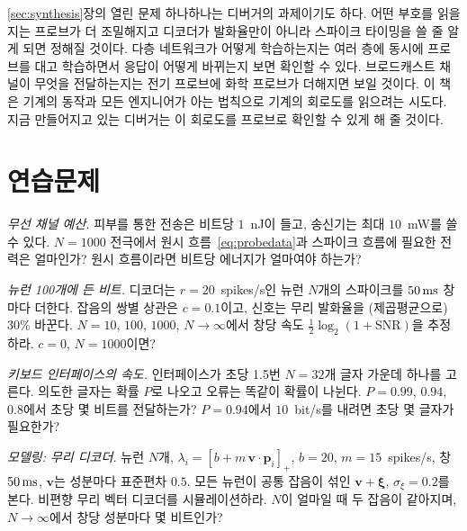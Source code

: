 \ref{sec:synthesis}장의 열린 문제 하나하나는 디버거의 과제이기도 하다. 어떤 부호를 읽을지는 프로브가 더 조밀해지고 디코더가 발화율만이 아니라 스파이크 타이밍을 쓸 줄 알게 되면 정해질 것이다. 다층 네트워크가 어떻게 학습하는지는 여러 층에 동시에 프로브를 대고 학습하면서 응답이 어떻게 바뀌는지 보면 확인할 수 있다. 브로드캐스트 채널이 무엇을 전달하는지는 전기 프로브에 화학 프로브가 더해지면 보일 것이다. 이 책은 기계의 동작과 모든 엔지니어가 아는 법칙으로 기계의 회로도를 읽으려는 시도다. 지금 만들어지고 있는 디버거는 이 회로도를 프로브로 확인할 수 있게 해 줄 것이다.

\section{연습문제}

\begin{exercise}[\lvlA]
\label{ex:17:1}
\emph{무선 채널 예산.} 피부를 통한 전송은 비트당 $1$~nJ이 들고, 송신기는 최대 $10$~mW를 쓸 수 있다. $N=1000$ 전극에서 원시 흐름~\eqref{eq:probedata}과 스파이크 흐름에 필요한 전력은 얼마인가? 원시 흐름이라면 비트당 에너지가 얼마여야 하는가?
\end{exercise}

\begin{exercise}[\lvlA]
\label{ex:17:2}
\emph{뉴런 100개에 든 비트.} 디코더는 $r=20$~spikes/s인 뉴런 $N$개의 스파이크를 $50\,\text{ms}$ 창마다 더한다. 잡음의 쌍별 상관은 $c=0.1$이고, 신호는 무리 발화율을 (제곱평균으로) $30\%$ 바꾼다. $N=10$, $100$, $1000$, $N\to\infty$에서 창당 속도 $\tfrac12\log_2(1+\text{SNR})$을 추정하라. $c=0$, $N=1000$이면?
\end{exercise}

\begin{exercise}[\lvlB]
\label{ex:17:3}
\emph{키보드 인터페이스의 속도.} 인터페이스가 초당 1.5번 $N=32$개 글자 가운데 하나를 고른다. 의도한 글자는 확률 $P$로 나오고 오류는 똑같이 확률이 나뉜다. $P=0.99$, $0.94$, $0.8$에서 초당 몇 비트를 전달하는가? $P=0.94$에서 $10$~bit/s를 내려면 초당 몇 글자가 필요한가?
\end{exercise}

\begin{exercise}[\lvlB]
\label{ex:17:4}
\emph{모델링: 무리 디코더.} 뉴런 $N$개, $\lambda_i=[b+m\,\mathbf v\cdot\mathbf p_i]_+$, $b=20$, $m=15$~spikes/s, 창 $50\,\text{ms}$, $\mathbf v$는 성분마다 표준편차 $0.5$. 모든 뉴런이 공통 잡음이 섞인 $\mathbf v+\boldsymbol\xi$, $\sigma_\xi=0.2$를 본다. 비편향 무리 벡터 디코더를 시뮬레이션하라. $N$이 얼마일 때 두 잡음이 같아지며, $N\to\infty$에서 창당 성분마다 몇 비트인가?
\end{exercise}

